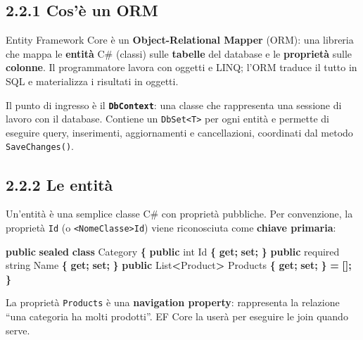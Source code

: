 \documentclass[
  italian,
  10pt,
]{book}
\newenvironment{Shaded}{\begin{snugshade}}{\end{snugshade}}
\newcommand{\DataTypeTok}[1]{\textcolor[rgb]{0.13,0.29,0.53}{#1}}
\newcommand{\KeywordTok}[1]{\textcolor[rgb]{0.13,0.29,0.53}{\textbf{#1}}}
\newcommand{\NormalTok}[1]{#1}
\newcommand{\OperatorTok}[1]{\textcolor[rgb]{0.81,0.36,0.00}{\textbf{#1}}}
\begin{document}
\subsection{2.2.1 Cos'è un ORM}\label{cosuxe8-un-orm}

Entity Framework Core è un \textbf{Object-Relational Mapper} (ORM): una
libreria che mappa le \textbf{entità} C\# (classi) sulle
\textbf{tabelle} del database e le \textbf{proprietà} sulle
\textbf{colonne}. Il programmatore lavora con oggetti e LINQ; l'ORM
traduce il tutto in SQL e materializza i risultati in oggetti.

Il punto di ingresso è il \textbf{\texttt{DbContext}}: una classe che
rappresenta una sessione di lavoro con il database. Contiene un
\texttt{DbSet\textless{}T\textgreater{}} per ogni entità e permette di
eseguire query, inserimenti, aggiornamenti e cancellazioni, coordinati
dal metodo \texttt{SaveChanges()}.

\subsection{2.2.2 Le entità}\label{le-entituxe0}

Un'entità è una semplice classe C\# con proprietà pubbliche. Per
convenzione, la proprietà \texttt{Id} (o
\texttt{\textless{}NomeClasse\textgreater{}Id}) viene riconosciuta come
\textbf{chiave primaria}:

\begin{Shaded}
\begin{Highlighting}[]
\KeywordTok{public} \KeywordTok{sealed} \KeywordTok{class}\NormalTok{ Category}
\OperatorTok{\{}
    \KeywordTok{public} \DataTypeTok{int}\NormalTok{ Id }\OperatorTok{\{} \KeywordTok{get}\OperatorTok{;} \KeywordTok{set}\OperatorTok{;} \OperatorTok{\}}
    \KeywordTok{public}\NormalTok{ required }\DataTypeTok{string}\NormalTok{ Name }\OperatorTok{\{} \KeywordTok{get}\OperatorTok{;} \KeywordTok{set}\OperatorTok{;} \OperatorTok{\}}
    \KeywordTok{public}\NormalTok{ List}\OperatorTok{\textless{}}\NormalTok{Product}\OperatorTok{\textgreater{}}\NormalTok{ Products }\OperatorTok{\{} \KeywordTok{get}\OperatorTok{;} \KeywordTok{set}\OperatorTok{;} \OperatorTok{\}} \OperatorTok{=} \OperatorTok{[];}
\OperatorTok{\}}
\end{Highlighting}
\end{Shaded}

La proprietà \texttt{Products} è una \textbf{navigation property}:
rappresenta la relazione ``una categoria ha molti prodotti''. EF Core la
userà per eseguire le join quando serve.
\end{document}
